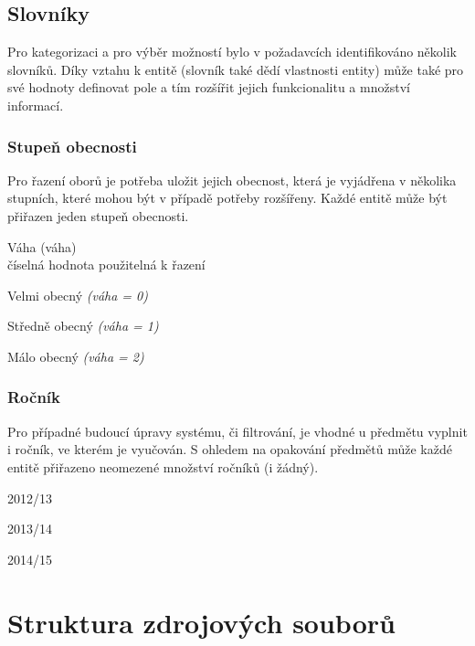 \subsection{Slovníky}

Pro kategorizaci a pro výběr možností bylo v požadavcích identifikováno několik slovníků. Díky vztahu k entitě (slovník také dědí vlastnosti entity) může také pro své hodnoty definovat pole a tím rozšířit jejich funkcionalitu a množství informací.

\subsubsection*{Stupeň obecnosti}
Pro řazení oborů je potřeba uložit jejich obecnost, která je vyjádřena v několika stupních, které mohou být v případě potřeby rozšířeny. Každé entitě může být přiřazen jeden stupeň obecnosti.

\begin{list}{-}{Pole}
  \item Váha (váha) \hfill \\
    číselná hodnota použitelná k řazení
\end{list}

\begin{list}{-}{Hodnoty}
  \item Velmi obecný \emph{(váha = 0)} 
  \item Středně obecný \emph{(váha = 1)}
  \item Málo obecný \emph{(váha = 2)}
\end{list}

\subsubsection*{Ročník}
Pro případné budoucí úpravy systému, či filtrování, je vhodné u předmětu vyplnit i ročník, ve kterém je vyučován. S ohledem na opakování předmětů může každé entitě přiřazeno neomezené množství ročníků (i žádný). 

\begin{list}{-}{Hodnoty}
  \item 2012/13
  \item 2013/14
  \item 2014/15
\end{list}

\section{Struktura zdrojových souborů}

